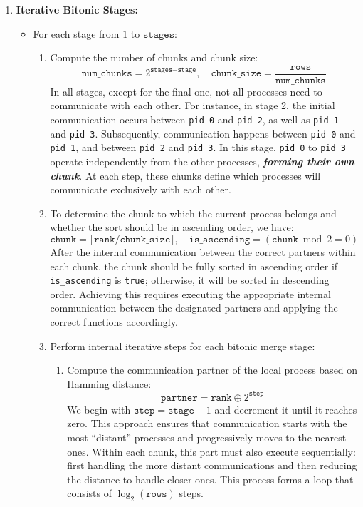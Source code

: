 \documentclass[12pt]{article}
\begin{document}
\begin{enumerate}[nosep]
    \item \textbf{Iterative Bitonic Stages:}
    \begin{itemize}[noitemsep]
        \item For each stage from $1$ to $\texttt{stages}$:
        \begin{enumerate}
            \item Compute the number of chunks and chunk size:
            \[
            \texttt{num\_chunks} = 2^{\texttt{stages} - \texttt{stage}}, \quad
            \texttt{chunk\_size} = \frac{\texttt{rows}}{\texttt{num\_chunks}}
            \]
            In all stages, except for the final one, not all processes need to communicate with each other. For instance, in stage 2, the initial communication occurs between \texttt{pid 0} and \texttt{pid 2}, as well as \texttt{pid 1} and \texttt{pid 3}. Subsequently, communication happens between \texttt{pid 0} and \texttt{pid 1}, and between \texttt{pid 2} and \texttt{pid 3}. In this stage, \texttt{pid 0} to \texttt{pid 3} operate independently from the other processes, \textit{\textbf{forming their own chunk}}. At each step, these chunks define which processes will communicate exclusively with each other.
            
            \item To determine the chunk to which the current process belongs and whether the sort should be in ascending order, we have:
            \[
            \texttt{chunk} = \lfloor \texttt{rank} / \texttt{chunk\_size} \rfloor, \quad
            \texttt{is\_ascending} = (\texttt{chunk} \bmod 2 = 0)
            \]
            After the internal communication between the correct partners within each chunk, the chunk should be fully sorted in ascending order if \texttt{is\_ascending} is \texttt{true}; otherwise, it will be sorted in descending order. Achieving this requires executing the appropriate internal communication between the designated partners and applying the correct functions accordingly. 
            
            \item Perform internal iterative steps for each bitonic merge stage:
            \begin{enumerate}[noitemsep]
                \item Compute the communication partner of the local process based on Hamming distance:
                \[
                \texttt{partner} = \texttt{rank} \oplus 2^{\texttt{step}}
                \]
                We begin with \(\texttt{step} = \texttt{stage} - 1\) and decrement it until it reaches zero. This approach ensures that communication starts with the most ``distant'' processes and progressively moves to the nearest ones. Within each chunk, this part must also execute sequentially: first handling the more distant communications and then reducing the distance to handle closer ones. This process forms a loop that consists of \(\log_2(\texttt{rows})\) steps.
                

\end{enumerate}
\end{enumerate}
\end{itemize}
\end{enumerate}
\end{document}
